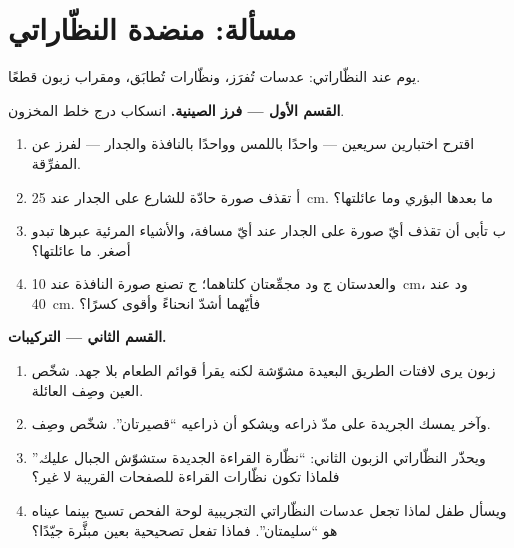 \section{مسألة: منضدة النظّاراتي}

\begin{problem}\label{pb:g8:lenses-images:1}
يوم عند النظّاراتي: عدسات تُفرَز، ونظّارات تُطابَق، ومقراب
زبون قطعًا.

\medskip\noindent\textbf{القسم الأول --- فرز الصينية.}
انسكاب درج خلط المخزون.
\begin{enumerate}
  \item اقترح اختبارين سريعين --- واحدًا باللمس وواحدًا
        بالنافذة والجدار --- لفرز  عن
        المفرِّقة.
  \item {} أ تقذف صورة حادّة للشارع على الجدار عند
        \qty{25}{cm}. ما بعدها البؤري وما عائلتها؟
  \item {} ب تأبى أن تقذف أيّ صورة على الجدار عند أيّ
        مسافة، والأشياء المرئية عبرها تبدو أصغر. ما عائلتها؟
  \item والعدستان ج ود مجمِّعتان كلتاهما؛  ج تصنع صورة
        النافذة عند \qty{10}{cm}، ود عند \qty{40}{cm}.
        فأيّهما أشدّ انحناءً وأقوى كسرًا؟
\end{enumerate}

\medskip\noindent\textbf{القسم الثاني --- التركيبات.}
\begin{enumerate}[resume]
  \item زبون يرى لافتات الطريق البعيدة مشوّشة لكنه يقرأ قوائم
        الطعام بلا جهد. شخّص العين وصِف العائلة.
  \item وآخر يمسك الجريدة على مدّ ذراعه ويشكو أن ذراعيه
        ``قصيرتان''. شخّص وصِف.
  \item ويحذّر النظّاراتي الزبون الثاني: ``نظّارة القراءة
        الجديدة ستشوّش الجبال عليك.'' فلماذا تكون نظّارات
        القراءة للصفحات القريبة لا غير؟
  \item ويسأل طفل لماذا تجعل عدسات النظّاراتي التجريبية لوحة
        الفحص تسبح بينما عيناه هو ``سليمتان''. فماذا تفعل
         تصحيحية بعين مبئَّرة جيّدًا؟
\end{enumerate}


\end{problem}

